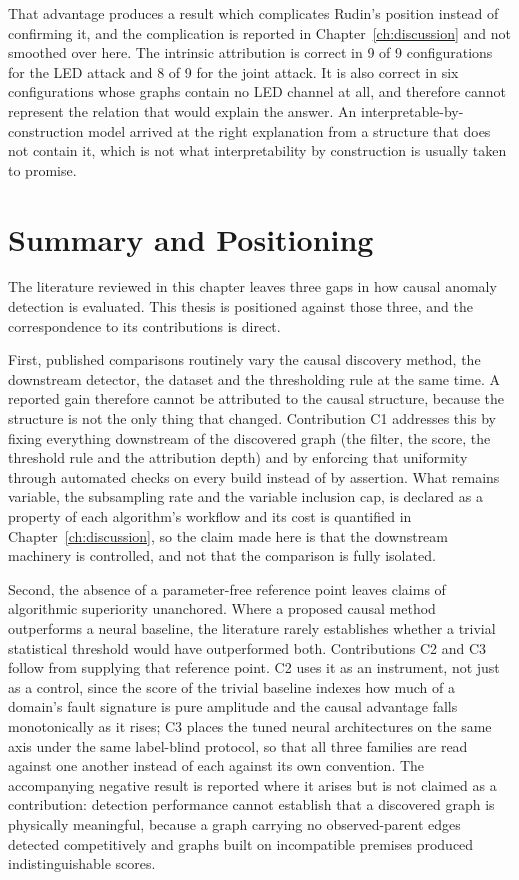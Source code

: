 That advantage produces a result which complicates Rudin's position instead of confirming it, and the complication is reported in Chapter~\ref{ch:discussion} and not smoothed over here. The intrinsic attribution is correct in 9 of 9 configurations for the LED attack and 8 of 9 for the joint attack. It is also correct in six configurations whose graphs contain no LED channel at all, and therefore cannot represent the relation that would explain the answer. An interpretable-by-construction model arrived at the right explanation from a structure that does not contain it, which is not what interpretability by construction is usually taken to promise.

\section{Summary and Positioning}
\label{sec:rw-gap}

The literature reviewed in this chapter leaves three gaps in how causal anomaly detection is evaluated. This thesis is positioned against those three, and the correspondence to its contributions is direct.

First, published comparisons routinely vary the causal discovery method, the downstream detector, the dataset and the thresholding rule at the same time. A reported gain therefore cannot be attributed to the causal structure, because the structure is not the only thing that changed. Contribution C1 addresses this by fixing everything downstream of the discovered graph (the filter, the score, the threshold rule and the attribution depth) and by enforcing that uniformity through automated checks on every build instead of by assertion. What remains variable, the subsampling rate and the variable inclusion cap, is declared as a property of each algorithm's workflow and its cost is quantified in Chapter~\ref{ch:discussion}, so the claim made here is that the downstream machinery is controlled, and not that the comparison is fully isolated.

Second, the absence of a parameter-free reference point leaves claims of algorithmic superiority unanchored. Where a proposed causal method outperforms a neural baseline, the literature rarely establishes whether a trivial statistical threshold would have outperformed both. Contributions C2 and C3 follow from supplying that reference point. C2 uses it as an instrument, not just as a control, since the score of the trivial baseline indexes how much of a domain's fault signature is pure amplitude and the causal advantage falls monotonically as it rises; C3 places the tuned neural architectures on the same axis under the same label-blind protocol, so that all three families are read against one another instead of each against its own convention. The accompanying negative result is reported where it arises but is not claimed as a contribution: detection performance cannot establish that a discovered graph is physically meaningful, because a graph carrying no observed-parent edges detected competitively and graphs built on incompatible premises produced indistinguishable scores.

